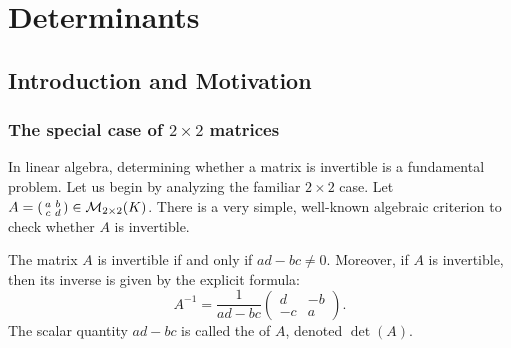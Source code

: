 \renewcommand{\thetheorem}{20.a.\arabic{theorem}}
\setcounter{theorem}{0}
\setcounter{chapter}{19} %

\chapter{Determinants}

\section{Introduction and Motivation}

\subsection{The special case of \texorpdfstring{$2 \times 2$}{2x2} matrices}
In linear algebra, determining whether a matrix is invertible is a fundamental problem. Let us begin by analyzing the familiar $2 \times 2$ case. Let $A = (\begin{smallmatrix} a & b \\ c & d \end{smallmatrix}) \in \mathcal{M}_{2 \times 2}(K)$. There is a very simple, well-known algebraic criterion to check whether $A$ is invertible.

\begin{proposition}\label{prop:inv_2x2}
  The matrix $A$ is invertible if and only if $ad - bc \neq 0$. Moreover, if $A$ is invertible, then its inverse is given by the explicit formula:
  \[
  A^{-1} = \frac{1}{ad - bc} \begin{pmatrix} d & -b \\ -c & a \end{pmatrix}.
  \]
  The scalar quantity $ad - bc$ is called the  of $A$, denoted $\det(A)$.
\end{proposition}

